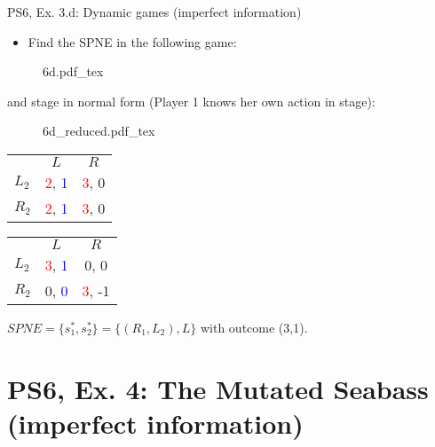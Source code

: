 \begin{frame}{PS6, Ex. 3.d: Dynamic games (imperfect information)}
    \begin{itemize}
      \item[(d)] Find the SPNE in the following game:
    \end{itemize}
    \vspace{-4pt}
    \begin{figure}[!h]
      \center
      \def\svgwidth{.8\columnwidth}
      {6d.pdf_tex}
    \end{figure}
    \vspace{-4pt}
     and  stage in normal form (Player 1 knows her own action in  stage):
    \vspace{-4pt}
    \begin{figure}[!h]
      \center
      \def\svgwidth{.25\columnwidth}
      {6d_reduced.pdf_tex}
    \end{figure}
    \vspace{-9pt}
    \begin{table}
      \begin{tabular}{l|c|c|}
        \multicolumn{1}{c}{} & \multicolumn{1}{c}{\color{blue}$L$} & \multicolumn{1}{c}{$R$} \\\cline{2-3}
        $L_2$ & \textcolor{red}{2}, \textcolor{blue}{1} & \textcolor{red}{3}, 0 \\\cline{2-3}
        $R_2$ & \textcolor{red}{2}, \textcolor{blue}{1} & \textcolor{red}{3}, 0 \\\cline{2-3}
      \end{tabular}
      \enskip
      \begin{tabular}{l|c|c|}
        \multicolumn{1}{c}{} & \multicolumn{1}{c}{\color{blue}$L$} & \multicolumn{1}{c}{$R$} \\\cline{2-3}
        $L_2$ & \textcolor{red}{3}, \textcolor{blue}{1} & 0, 0 \\\cline{2-3}
        $R_2$ & 0, \textcolor{blue}{0} & \textcolor{red}{3}, -1 \\\cline{2-3}
      \end{tabular}
    \end{table}
    \vspace{-4pt}
    $SPNE=\{s_1^{*},s_2^{*}\}=\{(R_1,L_2),L\}$ with outcome (3,1).
    \vfill\null
\end{frame}



\section{PS6, Ex. 4: The Mutated Seabass (imperfect information)}

